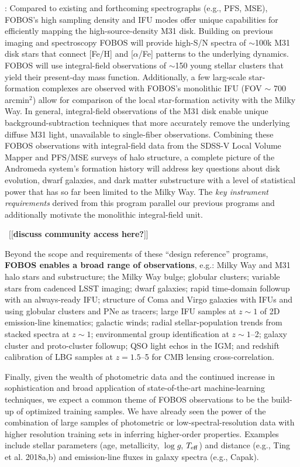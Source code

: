 \documentclass[oneside,11pt]{amsart}
\newcommand{\comment}[2][todo]{{\color{#1}[[{\bf #2}]]}}
\begin{document}
: Compared to
existing and forthcoming spectrographs (e.g., PFS, MSE), FOBOS's high
sampling density and IFU modes offer unique capabilities for
efficiently mapping the high-source-density M31 disk. Building on
previous imaging \citep[PHAT][]{phat} and spectroscopy
\citep[SPLASH][]{splash} FOBOS will provide high-S/N spectra of
$\sim$100k M31 disk stars that connect [Fe/H] and [$\alpha$/Fe]
patterns to the underlying dynamics. FOBOS will use integral-field
observations of $\sim$150 young stellar clusters that yield their
present-day mass function. Additionally, a few larg-scale
star-formation complexes are observed with FOBOS's monolithic IFU
(FOV $\sim$ 700 arcmin$^2$) allow for comparison of the local
star-formation activity with the Milky Way. In general,
integral-field observations of the M31 disk enable unique
background-subtraction techniques that more accurately remove the
underlying diffuse M31 light, unavailable to single-fiber
observations. Combining these FOBOS observations with integral-field
data from the SDSS-V Local Volume Mapper and PFS/MSE surveys of halo
structure, a complete picture of the Andromeda system's formation
history will address key questions about disk evolution, dwarf
galaxies, and dark matter substructure with a level of statistical
power that has so far been limited to the Milky Way. The {\it key
instrument requirements} derived from this program parallel our
previous programs and additionally motivate the monolithic
integral-field unit.

~\comment{discuss community access here?}

Beyond the scope and requirements of these ``design reference''
programs, {\bf FOBOS enables a broad range of observations}, e.g.:
Milky Way and M31 halo stars and substructure; the Milky Way bulge;
globular clusters; variable stars from cadenced LSST imaging; dwarf
galaxies; rapid time-domain followup with an always-ready IFU;
structure of Coma and Virgo galaxies with IFUs and using globular
clusters and PNe as tracers; large IFU samples at $z \sim 1$ of 2D
emission-line kinematics; galactic winds; radial stellar-population
trends from stacked spectra at $z \sim 1$; environmental group
identification at $z \sim 1$--2; galaxy cluster and proto-cluster
followup; QSO light echos in the IGM; and redshift calibration of LBG
samples at $z = 1.5$--5 for CMB lensing cross-correlation.

Finally, given the wealth of photometric data and the continued
increase in sophistication and broad application of state-of-the-art
machine-learning techniques, we expect a common theme of FOBOS
observations to be the build-up of optimized training samples. We
have already seen the power of the combination of large samples of
photometric or low-spectral-resolution data with higher resolution
training sets in inferring higher-order properties. Examples include
stellar parameters (age, metallicity, $\log g$, $T_{\rm eff}$) and
distance (e.g., Ting et al. 2018a,b) and emission-line fluxes in
galaxy spectra (e.g., Capak).
\end{document}
